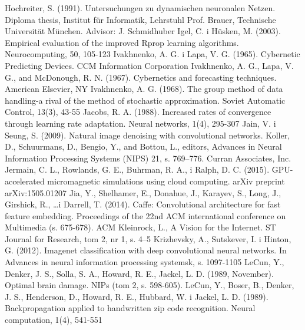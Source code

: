 \documentclass[12pt,a4paper,twoside]{article}
\begin{document}
\begin{thebibliography}{99}
 Hochreiter, S. (1991). Untersuchungen zu dynamischen neuronalen Netzen. Diploma thesis, Institut für Informatik, Lehrstuhl Prof. Brauer, Technische Universität München. Advisor: J. Schmidhuber
 Igel, C. i Hüsken, M. (2003). Empirical evaluation of the improved Rprop learning algorithms. Neurocomputing, 50, 105-123
 Ivakhnenko, A. G. i Lapa, V. G. (1965). Cybernetic Predicting Devices. CCM Information Corporation
 Ivakhnenko, A. G., Lapa, V. G., and McDonough, R. N. (1967). Cybernetics and forecasting techniques. American Elsevier, NY
 Ivakhnenko, A. G. (1968). The group method of data handling-a rival of the method of stochastic approximation. Soviet Automatic Control, 13(3), 43-55
 Jacobs, R. A. (1988). Increased rates of convergence through learning rate adaptation. Neural networks, 1(4), 295-307
 Jain, V. i Seung, S. (2009). Natural image denoising with convolutional networks. Koller, D., Schuurmans, D., Bengio, Y., and Bottou, L., editors, Advances in Neural Information Processing Systems (NIPS) 21, s. 769–776. Curran Associates, Inc.
 Jermain, C. L., Rowlands, G. E., Buhrman, R. A., i Ralph, D. C. (2015). GPU-accelerated micromagnetic simulations using cloud computing. arXiv preprint arXiv:1505.01207
 Jia, Y., Shelhamer, E., Donahue, J., Karayev, S., Long, J., Girshick, R., \ldots i Darrell, T. (2014). Caffe: Convolutional architecture for fast feature embedding. Proceedings of the 22nd ACM international conference on Multimedia (s. 675-678). ACM
 Kleinrock, L., A Vision for the Internet. ST Journal for Research, tom 2, nr 1, s. 4–5
 Krizhevsky, A., Sutskever, I. i Hinton, G. (2012). Imagenet classification with deep convolutional neural networks. In Advances in neural information processing systemsk, s. 1097-1105
 LeCun, Y., Denker, J. S., Solla, S. A., Howard, R. E., Jackel, L. D. (1989, November). Optimal brain damage. NIPs (tom 2, s. 598-605).
 LeCun, Y., Boser, B., Denker, J. S., Henderson, D., Howard, R. E., Hubbard, W. i Jackel, L. D. (1989). Backpropagation applied to handwritten zip code recognition. Neural computation, 1(4), 541-551

\end{thebibliography}
\end{document}
